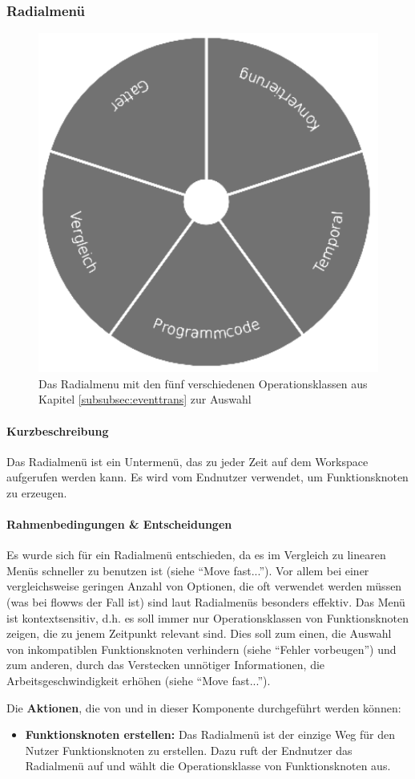 \subsubsection{Radialmenü}

\begin{figure}[h]
  \centering
  \includegraphics[width=.4\textwidth]{bilder/chapter4/chapter4_3/radialmenu.pdf}
  \caption{Das Radialmenu mit den fünf verschiedenen Operationsklassen aus Kapitel \ref{subsubsec:eventtrans} zur Auswahl}
  \label{fig:radialmenu}
\end{figure}

\paragraph{Kurzbeschreibung} Das Radialmenü ist ein Untermenü, das zu jeder Zeit auf dem Workspace aufgerufen werden kann. Es wird vom Endnutzer verwendet, um Funktionsknoten zu erzeugen.

\paragraph{Rahmenbedingungen \& Entscheidungen} Es wurde sich für ein Radialmenü entschieden, da es im Vergleich zu linearen Menüs schneller zu benutzen ist (siehe "`Move fast..."'). Vor allem bei einer vergleichsweise geringen Anzahl von Optionen, die oft verwendet werden müssen (was bei flowws der Fall ist) sind laut \cite{kurtenbach1994user} Radialmenüs besonders effektiv. Das Menü ist kontextsensitiv, d.h. es soll immer nur Operationsklassen von Funktionsknoten zeigen, die zu jenem Zeitpunkt relevant sind. Dies soll zum einen, die Auswahl von inkompatiblen Funktionsknoten verhindern (siehe "`Fehler vorbeugen"') und zum anderen, durch das Verstecken unnötiger Informationen, die Arbeitsgeschwindigkeit erhöhen (siehe "`Move fast..."').

Die \textbf{Aktionen}, die von und in dieser Komponente durchgeführt werden können: 
\begin{itemize}
    \item \textbf{Funktionsknoten erstellen:} Das Radialmenü ist der einzige Weg für den Nutzer Funktionsknoten zu erstellen. Dazu ruft der Endnutzer das Radialmenü auf und wählt die Operationsklasse von Funktionsknoten aus.
\end{itemize}


